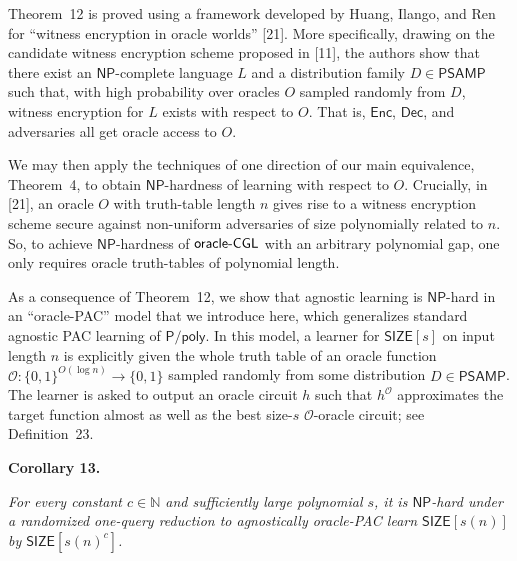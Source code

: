 


Theorem 12 is proved using a framework developed by Huang, Ilango, and Ren for “witness encryption in oracle worlds” [21]. More specifically, drawing on the candidate witness encryption scheme proposed in [11], the authors show that there exist an ${\mathsf{NP}}$-complete language $L$ and a distribution family $D\in{\mathsf{P}}{\mathsf{SAMP}}$ such that, with high probability over oracles $O$ sampled randomly from $D$, witness encryption for $L$ exists with respect to $O$. That is, ${\mathsf{Enc}}$, ${\mathsf{Dec}}$, and adversaries all get oracle access to $O$.\par




We may then apply the techniques of one direction of our main equivalence, Theorem 4, to obtain ${\mathsf{NP}}$-hardness of learning with respect to $O$. Crucially, in [21], an oracle $O$ with truth-table length $n$ gives rise to a witness encryption scheme secure against non-uniform adversaries of size polynomially related to $n$. So, to achieve ${\mathsf{NP}}$-hardness of ${\sf oracle}\text{-}{\sf CGL}$ with an arbitrary polynomial gap, one only requires oracle truth-tables of polynomial length.\par




As a consequence of Theorem 12, we show that agnostic learning is ${\mathsf{NP}}$-hard in an “oracle-PAC” model that we introduce here, which generalizes standard agnostic PAC learning of ${\mathsf{P}}/{\mathsf{poly}}$. In this model, a learner for ${\mathsf{SIZE}}[s]$ on input length $n$ is explicitly given the whole truth table of an oracle function $\mathcal{O}:\{0,1\}^{O(\log n)}\to\{0,1\}$ sampled randomly from some distribution $D\in{\mathsf{P}}{\mathsf{SAMP}}$. The learner is asked to output an oracle circuit $h$ such that $h^{\mathcal{O}}$ approximates the target function almost as well as the best size-$s$ $\mathcal{O}$-oracle circuit; see Definition 23.\par





\par\medskip\noindent\textbf{
\textbf{Corollary 13}\textbf{.}
}\par



\emph{For every constant $c\in\mathbb{N}$ and sufficiently large polynomial $s$, it is ${\mathsf{NP}}$-hard under a randomized one-query reduction to agnostically oracle-PAC learn ${\mathsf{SIZE}}[s(n)]$ by ${\mathsf{SIZE}}[s(n)^{c}]$.}\par



